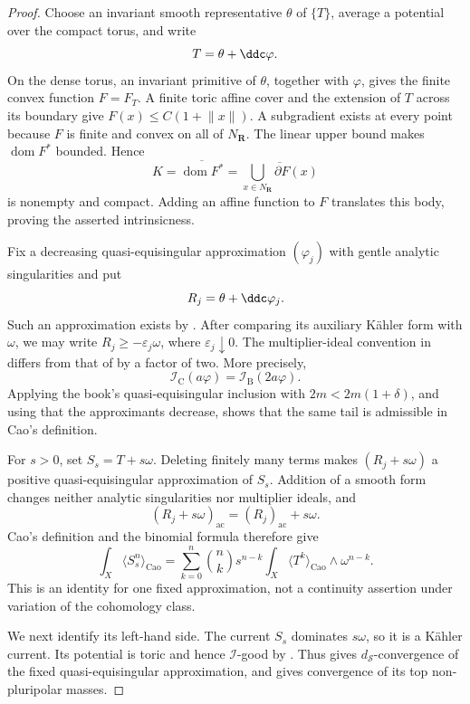 \begin{proof}
Choose an invariant smooth representative $\theta$ of $\{T\}$, average
a potential over the compact torus, and write
\[
                         T=\theta+\ddc\varphi.
\]
On the dense torus, an invariant primitive of $\theta$, together with
$\varphi$, gives the finite convex function $F=F_T$.  A finite toric
affine cover and the extension of $T$ across its boundary give
$F(x)\leq C(1+\lVert x\rVert)$.  A subgradient exists at every point
because $F$ is finite and convex on all of $N_{\mathbf R}$.  The linear
upper bound makes $\operatorname{dom}F^*$ bounded.  Hence
\[
 K=\overline{\operatorname{dom}F^*}
  =\overline{\bigcup_{x\in N_{\mathbf R}}\partial F(x)}
\]
is nonempty and compact.  Adding an affine function to $F$ translates
this body, proving the asserted intrinsicness.

Fix a decreasing quasi-equisingular approximation $(\varphi_j)$ with
gentle analytic singularities and put
\[
                       R_j=\theta+\ddc\varphi_j.
\]
Such an approximation exists by
\cite[Theorem~1.6.2 and Definition~1.6.5]{XiaBook}.  After comparing its
auxiliary K\"ahler form with $\omega$, we may write
$R_j\geq-\varepsilon_j\omega$, where $\varepsilon_j\downarrow0$.
The multiplier-ideal convention in \cite{Cao14} differs from that of
\cite{XiaBook} by a factor of two.  More precisely,
\[
             \mathcal I_{\mathrm C}(a\varphi)
             =\mathcal I_{\mathrm B}(2a\varphi).
\]
Applying the book's quasi-equisingular inclusion with
$2m<2m(1+\delta)$, and using that the approximants decrease, shows that
the same tail is admissible in Cao's definition.

For $s>0$, set $S_s=T+s\omega$.  Deleting finitely many terms makes
$(R_j+s\omega)$ a positive quasi-equisingular approximation of $S_s$.
Addition of a smooth form changes neither analytic singularities nor
multiplier ideals, and
\[
              (R_j+s\omega)_{\mathrm{ac}}
              =(R_j)_{\mathrm{ac}}+s\omega.
\]
Cao's definition and the binomial formula therefore give
\[
 \int_X\langle S_s^n\rangle_{\mathrm{Cao}}
 =\sum_{k=0}^n\binom nk s^{n-k}
   \int_X\langle T^k\rangle_{\mathrm{Cao}}
                  \wedge\omega^{n-k}.
\tag{55.53}\label{eq:ok-cao-smooth-polynomial}
\]
This is an identity for one fixed approximation, not a continuity assertion
under variation of the cohomology class.

We next identify its left-hand side.  The current $S_s$ dominates
$s\omega$, so it is a K\"ahler current.  Its potential is toric and hence
$\mathcal I$-good by \cite[Example~7.4.1]{XiaBook}.  Thus
\cite[Theorem~7.1.1]{XiaBook} gives $d_{\mathcal S}$-convergence of the
fixed quasi-equisingular approximation, and
\cite[Theorem~6.2.1]{XiaBook} gives convergence of its top non-pluripolar
masses.


\end{proof}

